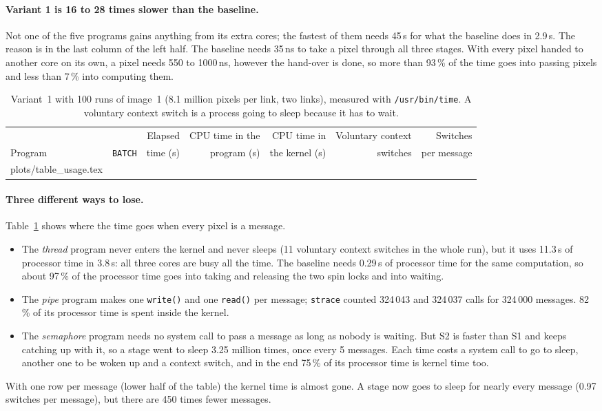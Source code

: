\documentclass[11pt,a4paper]{article}
\makeatletter
\newcommand{\rows}[1]{\@@input plots/#1.tex }
\makeatother
\begin{document}
\paragraph{Variant 1 is 16 to 28 times slower than the baseline.} Not one of the five programs
gains anything from its extra cores; the fastest of them needs 45\,s for what the baseline does in
2.9\,s. The reason is in the last column of the left half. The baseline needs 35\,ns to take a pixel
through all three stages. With every pixel handed to another core on its own, a pixel needs 550 to
1000\,ns, however the hand-over is done, so more than 93\,\% of the time goes into passing pixels
and less than 7\,\% into computing them.

\begin{table}[H]
\centering\small
\begin{tabular}{@{}lrrrrrr@{}}
\toprule
& & Elapsed & CPU time in the & CPU time in & Voluntary context & Switches \\
Program & \texttt{BATCH} & time (s) & program (s) & the kernel (s) & switches & per message \\
\midrule
\rows{table_usage}
\bottomrule
\end{tabular}
\caption{Variant~1 with 100 runs of image~1 (8.1 million pixels per link, two links), measured with
\texttt{/usr/bin/time}. A voluntary context switch is a process going to sleep because it has to wait.}
\label{tab:usage}
\end{table}

\paragraph{Three different ways to lose.} Table~\ref{tab:usage} shows where the time goes when every
pixel is a message.
\begin{itemize}\setlength{\itemsep}{1pt}
\item The \emph{thread} program never enters the kernel and never sleeps (11 voluntary context
switches in the whole run), but it uses 11.3\,s of processor time in 3.8\,s: all three cores are
busy all the time. The baseline needs 0.29\,s of processor time for the same computation, so about
97\,\% of the processor time goes into taking and releasing the two spin locks and into waiting.
\item The \emph{pipe} program makes one \texttt{write()} and one \texttt{read()} per message;
\texttt{strace} counted 324\,043 and 324\,037 calls for 324\,000 messages. 82\,\% of its processor
time is spent inside the kernel.
\item The \emph{semaphore} program needs no system call to pass a message as long as nobody is
waiting. But S2 is faster than S1 and keeps catching up with it, so a stage went to sleep 3.25
million times, once every 5 messages. Each time costs a system call to go to sleep, another one to
be woken up and a context switch, and in the end 75\,\% of its processor time is kernel time too.
\end{itemize}
With one row per message (lower half of the table) the kernel time is almost gone. A stage now goes
to sleep for nearly every message (0.97 switches per message), but there are 450 times fewer
messages.
\end{document}
